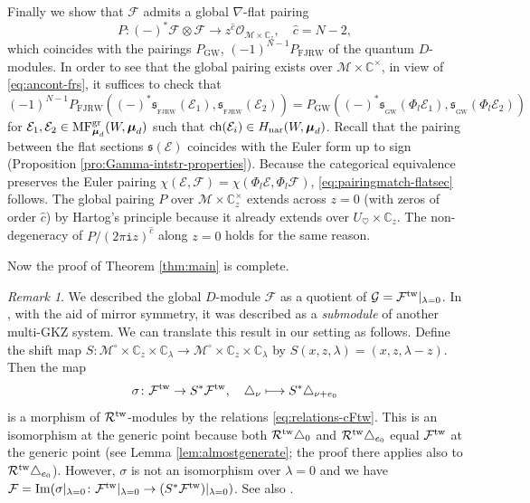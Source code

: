 \documentclass[11pt]{amsart}
\theoremstyle{definition} %
\theoremstyle{remark} %
\newtheorem{rem}[thm]{Remark}%
\newcommand{\CC}{\mathbb C}
\newcommand{\nar}{\operatorname{nar}}
\newcommand{\tw}{{\rm tw}}
\newcommand{\ch}{{\rm ch}}
\def\MFhom{\operatorname{{MF}}}
\def\GW{\operatorname{\text{GW}}}
\newcommand{\bmu}{\boldsymbol{\mu}}
\newcommand{\cO}{\mathcal{O}}
\newcommand{\cM}{\mathcal{M}}
\newcommand{\cMo}{\mathcal{M}^\circ}
\newcommand{\cE}{\mathcal{E}}
\newcommand{\cF}{\mathcal{F}}
\newcommand{\cG}{\mathcal{G}}
\newcommand{\cR}{\mathcal{R}}
\newcommand{\frs}{\mathfrak{s}}
\newcommand{\hc}{\hat{c}}
\newcommand{\FJRW}{{\operatorname{FJRW}}}
\newcommand{\sFJRW}{\operatorname{_{FJRW}}}
\renewcommand{\GW}{{\operatorname{GW}}}
\newcommand{\sGW}{\operatorname{_{GW}}}
\newcommand{\Image}{\operatorname{Im}}
\newcommand{\iu}{\mathtt{i}}
\begin{document}
Finally we show that $\cF$ admits a global $\nabla$-flat pairing 
\[
P \colon (-)^*\cF \otimes \cF \to z^{\hc} \cO_{\cM\times \CC_z}, 
\quad \hc = N-2, 
\]
which coincides with the pairings $P_{\GW}$, $(-1)^{N-1}P_{\FJRW}$
of the quantum $D$-modules. 
In order to see that the global pairing exists over 
$\cM\times \CC^\times$, in view of \eqref{eq:ancont-frs}, 
it suffices to check that 
\begin{equation} 
\label{eq:pairingmatch-flatsec} 
(-1)^{N-1} P_{\FJRW}((-)^*\frs_{\sFJRW}(\cE_1), \frs_{\sFJRW}(\cE_2)) = 
P_{\GW}((-)^*\frs_{\sGW}(\Phi_l \cE_1), \frs_{\sGW}(\Phi_l \cE_2))  
\end{equation}
for $\cE_1,\cE_2\in \MFhom^{\rm gr}_{\bmu_d}(W,\bmu_d)$ 
such that $\ch(\cE_i) \in H_{\nar}(W,\bmu_d)$. 
Recall that the pairing between the flat sections $\frs(\cE)$
coincides with the Euler form up to sign 
(Proposition \ref{pro:Gamma-intstr-properties}). 
Because the categorical equivalence preserves the 
Euler pairing $\chi(\cE,\cF) = \chi(\Phi_l \cE, \Phi_l \cF)$, 
\eqref{eq:pairingmatch-flatsec} follows. 
The global pairing $P$ over $\cM\times \CC_z^\times$ 
extends across $z=0$ (with zeros of order $\hc$) 
by Hartog's principle 
because it already extends over $U_\heartsuit \times \CC_z$. 
The non-degeneracy of $P/(2\pi\iu z)^{\hc}$ along $z=0$ 
holds for the same reason. 

Now the proof of Theorem \ref{thm:main} is complete. 


\begin{rem} 
We described the global $D$-module $\cF$  
as a quotient of $\cG = \cF^\tw|_{\lambda=0}$. 
In \cite[Theorem 6.13]{Iritani:period}, 
with the aid of mirror symmetry, 
it was described as a \emph{submodule} of another multi-GKZ system. 
We can translate this result in our setting as follows. 
Define the shift map $S \colon \cMo\times \CC_z \times 
\CC_\lambda \to \cMo\times \CC_z\times \CC_\lambda$ 
by 
$S(x,z,\lambda) = (x,z,\lambda-z)$. 
Then the map 
\[
\sigma \colon \cF^\tw \to S^* \cF^\tw, \quad 
\triangle_\nu \longmapsto S^* \triangle_{\nu+e_0}
\]
is a morphism of $\cR^\tw$-modules 
by the relations \eqref{eq:relations-cFtw}. 
This is an isomorphism at the generic point because 
both $\cR^\tw \triangle_0$ and $\cR^\tw \triangle_{e_0}$ 
equal $\cF^\tw$ at the generic point  
(see Lemma \ref{lem:almostgenerate}; the proof there  
applies also to $\cR^\tw \triangle_{e_0}$). 
However, $\sigma$ is not an isomorphism over $\lambda=0$ 
and we have $\cF = \Image (\sigma|_{\lambda=0} 
\colon \cF^\tw|_{\lambda=0} \to (S^*\cF^\tw)|_{\lambda=0} )$. 
See also \cite{Mann-Mignon}. 
\end{rem} 
\end{document}
